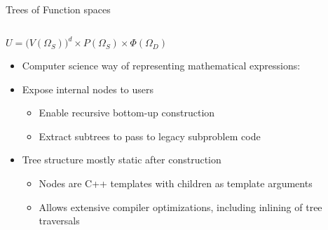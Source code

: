 \documentclass[ignorenonframetext,11pt]{beamer}
\theoremstyle{definition}
\begin{document}
\begin{frame}{Trees of Function spaces}
  \begin{columns}
    \begin{column}{0.6\textwidth}
$U = \bigl(V(\Omega_S)\bigr)^d \times P(\Omega_S) \times \Phi(\Omega_D)$

\begin{itemize}
\item Computer science way of representing mathematical  expressions: 
\item Expose internal nodes to users
  \begin{itemize}
  \item {\small Enable recursive bottom-up construction}
  \item {\small Extract subtrees to pass to legacy subproblem code}
  \end{itemize}
\item Tree structure mostly static after construction
  \begin{itemize}
  \item {\small Nodes are C++ templates with children as template arguments}
  \item {\small Allows extensive compiler optimizations, including inlining of tree traversals}
  \end{itemize}
\end{itemize}

    \end{column}
    \begin{column}{0.4\textwidth}

    \end{column}
  \end{columns}


\end{frame}
\end{document}
